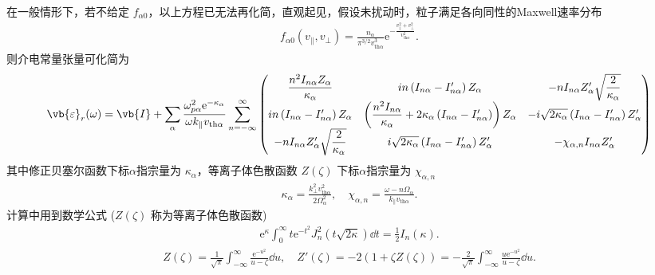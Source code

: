 在一般情形下，若不给定 \(f_{\alpha0}\)，以上方程已无法再化简，直观起见，假设未扰动时，粒子满足各向同性的Maxwell速率分布
\begin{align*}
	f_{\alpha0}\left(v_{\parallel},v_\perp\right) = \frac{n_\alpha}{\pi^{3/2}v_{\mathrm{th}\alpha}^3}\mathrm{e}^{-\frac{v_{\parallel}^2 + v_\perp^2}{v_{\mathrm{th}\alpha}^2}}.
\end{align*}
则介电常量张量可化简为
\begin{align*}
	\vb{\varepsilon}_r(\omega) = \vb{I} + \sum_\alpha\frac{\omega_{p\alpha}^2\mathrm{e}^{-\kappa_\alpha}}{\omega k_{\parallel}v_{\mathrm{th}\alpha}}
	\sum_{n=-\infty}^{\infty}
	\begin{pmatrix}
		\dfrac{n^2I_{n\alpha}Z_\alpha}{\kappa_\alpha}               & in\left(I_{n\alpha}-I_{n\alpha}^\prime\right)Z_\alpha                                                                & -nI_{n\alpha}Z_\alpha^\prime\sqrt{\dfrac{2}{\kappa_\alpha}}                       \\[6pt]
		in\left(I_{n\alpha}-I_{n\alpha}^\prime\right)Z_\alpha       & \left(\dfrac{n^2I_{n\alpha}}{\kappa_\alpha}+2\kappa_\alpha\left(I_{n\alpha}-I_{n\alpha}^\prime\right)\right)Z_\alpha & -i\sqrt{2\kappa_\alpha}\left(I_{n\alpha}-I_{n\alpha}^\prime\right)Z_\alpha^\prime \\[6pt]
		-nI_{n\alpha}Z_\alpha^\prime\sqrt{\dfrac{2}{\kappa_\alpha}} & i\sqrt{2\kappa_\alpha}\left(I_{n\alpha}-I_{n\alpha}^\prime\right)Z_\alpha^\prime                                     & -\chi_{\alpha,n}I_{n\alpha}Z_\alpha^\prime
	\end{pmatrix}
\end{align*}
其中修正贝塞尔函数下标\(\alpha\)指宗量为 \(\kappa_\alpha\)，等离子体色散函数 \(Z(\zeta)\) 下标\(\alpha\)指宗量为 \(\chi_{\alpha,n}\)
\begin{align*}
	\kappa_\alpha = \frac{k_\perp^2v_{\mathrm{th}\alpha}^2}{2\Omega_\alpha^2}, \quad \chi_{\alpha,n} = \frac{\omega - n\Omega_\alpha}{k_{\parallel}v_{\mathrm{th}\alpha}}.
\end{align*}
计算中用到数学公式 (\(Z(\zeta)\) 称为等离子体色散函数)
\begin{align*}
	\mathrm{e}^{\kappa}\int_{0}^{\infty}t\mathrm{e}^{-t^2}J_n^2\left(t\sqrt{2\kappa}\right)\dd t = \frac{1}{2}I_n(\kappa).
\end{align*}
\begin{align*}
	Z(\zeta) = \frac{1}{\sqrt{\pi}}\int_{-\infty}^{\infty}\frac{\mathrm{e}^{-u^2}}{u-\zeta}\dd u, \quad Z'(\zeta) = -2\left(1+\zeta Z(\zeta)\right) = -\frac{2}{\sqrt{\pi}}\int_{-\infty}^{\infty}\frac{u\mathrm{e}^{-u^2}}{u-\zeta}\dd u.
\end{align*}

